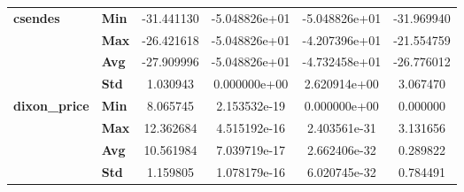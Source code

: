 \begin{longtable}{llcccc}
\cline{1-6}
\multirow{4}{*}{\textbf{csendes}} & \textbf{Min} &   -31.441130 & -5.048826e+01 &  -5.048826e+01 &   -31.969940 \\
            & \textbf{Max} &   -26.421618 & -5.048826e+01 &  -4.207396e+01 &   -21.554759 \\
            & \textbf{Avg} &   -27.909996 & -5.048826e+01 &  -4.732458e+01 &   -26.776012 \\
            & \textbf{Std} &     1.030943 &  0.000000e+00 &   2.620914e+00 &     3.067470 \\
\cline{1-6}
\multirow{4}{*}{\textbf{dixon_price}} & \textbf{Min} &     8.065745 &  2.153532e-19 &   0.000000e+00 &     0.000000 \\
            & \textbf{Max} &    12.362684 &  4.515192e-16 &   2.403561e-31 &     3.131656 \\
            & \textbf{Avg} &    10.561984 &  7.039719e-17 &   2.662406e-32 &     0.289822 \\
            & \textbf{Std} &     1.159805 &  1.078179e-16 &   6.020745e-32 &     0.784491 \\
\end{longtable}
